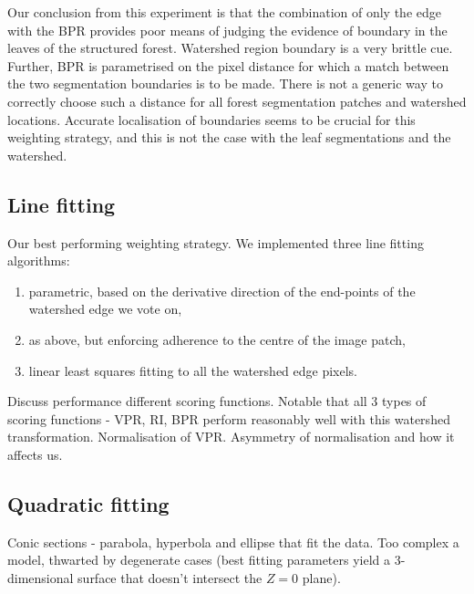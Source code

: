 Our conclusion from this experiment is that the combination of only the edge with the BPR provides poor means of judging the evidence of boundary in the leaves of the structured forest. Watershed region boundary is a very brittle cue. Further, BPR is parametrised on the pixel distance for which a match between the two segmentation boundaries is to be made. There is not a generic way to correctly choose such a distance for all forest segmentation patches and watershed locations. Accurate localisation of boundaries seems to be crucial for this weighting strategy, and this is not the case with the leaf segmentations and the watershed.

\subsection{Line fitting}
Our best performing weighting strategy. We implemented three line fitting algorithms:
\begin{enumerate}
  \item parametric, based on the derivative direction of the end-points of the watershed edge we vote on,
  \item as above, but enforcing adherence to the centre of the image patch,
  \item linear least squares fitting to all the watershed edge pixels.
\end{enumerate}

Discuss performance \wrt different scoring functions. Notable that all 3 types of scoring functions - VPR, RI, BPR perform reasonably well with this watershed transformation. Normalisation of VPR. Asymmetry of normalisation and how it affects us.

\subsection{Quadratic fitting} %
Conic sections - parabola, hyperbola and ellipse that fit the data. Too complex a model, thwarted by degenerate cases (best fitting parameters yield a 3-dimensional surface that doesn't intersect the $Z=0$ plane).


